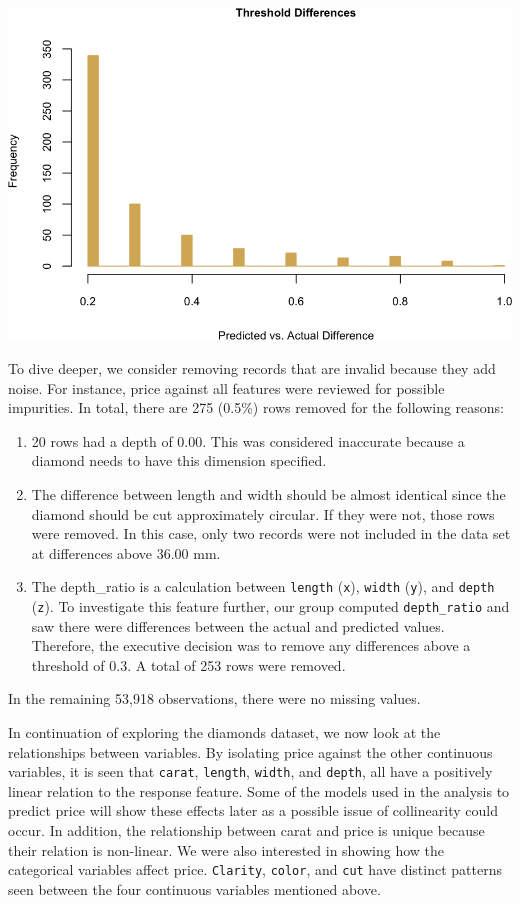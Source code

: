 \documentclass[
  paper=a4,
  ,captions=tableheading
]{scrartcl}
\begin{document}
\begin{center}\includegraphics{Diamonds_PDF_files/figure-latex/threshold diff hist-1} \end{center}

To dive deeper, we consider removing records that are invalid because
they add noise. For instance, price against all features were reviewed
for possible impurities. In total, there are 275 (0.5\%) rows removed
for the following reasons:

\begin{enumerate}
\def\labelenumi{\arabic{enumi}.}
\item
  20 rows had a depth of 0.00. This was considered inaccurate because a
  diamond needs to have this dimension specified.
\item
  The difference between length and width should be almost identical
  since the diamond should be cut approximately circular. If they were
  not, those rows were removed. In this case, only two records were not
  included in the data set at differences above 36.00 mm.
\item
  The depth\_ratio is a calculation between \texttt{length}
  (\texttt{x}), \texttt{width} (\texttt{y}), and \texttt{depth}
  (\texttt{z}). To investigate this feature further, our group computed
  \texttt{depth\_ratio} and saw there were differences between the
  actual and predicted values. Therefore, the executive decision was to
  remove any differences above a threshold of 0.3. A total of 253 rows
  were removed.
\end{enumerate}

In the remaining 53,918 observations, there were no missing values.

In continuation of exploring the diamonds dataset, we now look at the
relationships between variables. By isolating price against the other
continuous variables, it is seen that \texttt{carat}, \texttt{length},
\texttt{width}, and \texttt{depth}, all have a positively linear
relation to the response feature. Some of the models used in the
analysis to predict price will show these effects later as a possible
issue of collinearity could occur. In addition, the relationship between
carat and price is unique because their relation is non-linear. We were
also interested in showing how the categorical variables affect price.
\texttt{Clarity}, \texttt{color}, and \texttt{cut} have distinct
patterns seen between the four continuous variables mentioned above.
\end{document}
